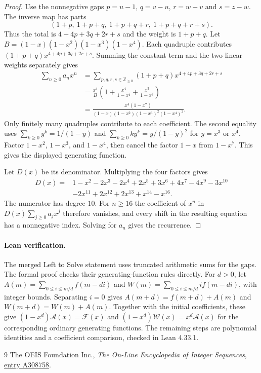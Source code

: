 \documentclass[10pt,letterpaper]{article}
\newcommand{\N}{\mathbb Z_{\geq 0}}
\begin{document}
\begin{proof}
Use the nonnegative gaps $p=u-1$, $q=v-u$, $r=w-v$ and $s=z-w$.
The inverse map has parts
\[
 (1+p,\ 1+p+q,\ 1+p+q+r,\ 1+p+q+r+s).
\]
Thus the total is $4+4p+3q+2r+s$ and the weight is $1+p+q$.
Let $B=(1-x)(1-x^2)(1-x^3)(1-x^4)$. Each quadruple contributes
$(1+p+q)x^{4+4p+3q+2r+s}$. Summing the constant term and the two linear
weights separately gives
\begin{align*}
\sum_{n\geq0} a_nx^n
 &= \sum_{p,q,r,s\in\N}(1+p+q)x^{4+4p+3q+2r+s}\\
 &= \frac{x^4}{B}\left(1+\frac{x^4}{1-x^4}+\frac{x^3}{1-x^3}\right)\\
 &= \frac{x^4(1-x^7)}{(1-x)(1-x^2)(1-x^3)^2(1-x^4)^2}.
\end{align*}
Only finitely many quadruples contribute to each coefficient. The second
equality uses $\sum_{k\geq0}y^k=1/(1-y)$ and
$\sum_{k\geq0}ky^k=y/(1-y)^2$ for $y=x^3$ or $x^4$. Factor $1-x^2$,
$1-x^3$, and $1-x^4$, then cancel the factor $1-x$ from $1-x^7$.
This gives the displayed generating function.

Let $D(x)$ be its denominator. Multiplying the four factors gives
\begin{align*}
D(x)={}&1-x^2-2x^3-2x^4+2x^5+3x^6+4x^7-4x^9-3x^{10}\\
       &-2x^{11}+2x^{12}+2x^{13}+x^{14}-x^{16}.
\end{align*}
The numerator has degree $10$. For $n\geq16$ the coefficient of $x^n$
in $D(x)\sum_{j\geq0}a_jx^j$ therefore vanishes, and every shift in the
resulting equation has a nonnegative index. Solving for $a_n$ gives the recurrence.
\end{proof}

\paragraph{Lean verification.}
The merged Left to Solve statement uses truncated arithmetic sums for the
gaps. The formal proof checks their generating-function rules directly.
For $d>0$, let $A(m)=\sum_{0\leq i\leq m/d}f(m-di)$ and
$W(m)=\sum_{0\leq i\leq m/d}i f(m-di)$, with integer bounds.
Separating $i=0$ gives $A(m+d)=f(m+d)+A(m)$ and $W(m+d)=W(m)+A(m)$.
Together with the initial coefficients, these give
$(1-x^d)\mathcal A(x)=\mathcal F(x)$ and $(1-x^d)\mathcal W(x)=x^d\mathcal A(x)$
for the corresponding ordinary generating functions. The remaining steps are
polynomial identities and a coefficient comparison, checked in Lean 4.33.1.

\begin{thebibliography}{9}
 The OEIS Foundation Inc., \emph{The On-Line Encyclopedia of Integer Sequences},
\href{https://oeis.org/A308758}{entry A308758}.
\end{thebibliography}
\end{document}
